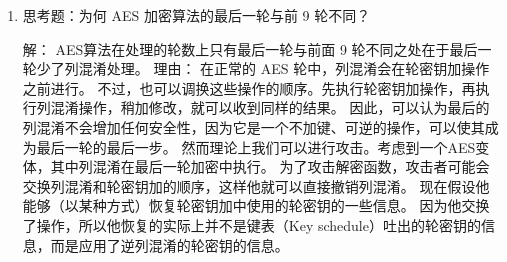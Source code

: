 \documentclass[degree=project,degree-type=project,cjk-font=noto]{thuthesis}
\begin{document}
\begin{enumerate}
\item 思考题：为何 AES 加密算法的最后一轮与前 9 轮不同？

{\heiti 解：}
\newline
AES算法在处理的轮数上只有最后一轮与前面 9 轮不同之处在于最后一轮少了列混淆处理。
理由：
\newline\newline
在正常的 AES 轮中，列混淆会在轮密钥加操作之前进行。
不过，也可以调换这些操作的顺序。先执行轮密钥加操作，再执行列混淆操作，稍加修改，就可以收到同样的结果。
因此，可以认为最后的列混淆不会增加任何安全性，因为它是一个不加键、可逆的操作，可以使其成为最后一轮的最后一步。
\newline\newline
然而理论上我们可以进行攻击。考虑到一个AES变体，其中列混淆在最后一轮加密中执行。
为了攻击解密函数，攻击者可能会交换列混淆和轮密钥加的顺序，这样他就可以直接撤销列混淆。
现在假设他能够（以某种方式）恢复轮密钥加中使用的轮密钥的一些信息。
因为他交换了操作，所以他恢复的实际上并不是键表（Key schedule）吐出的轮密钥的信息，而是应用了逆列混淆的轮密钥的信息。
\end{enumerate}
\end{document}
